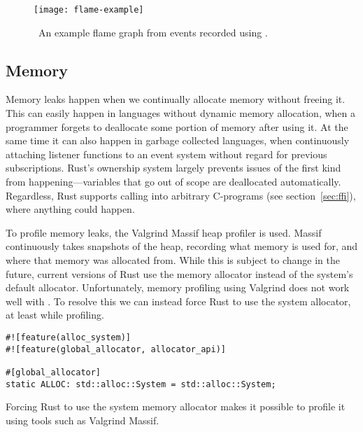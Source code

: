 \begin{figure}[H]
  \centering
  \texttt{[image: flame-example]}
  \caption{\
    An example flame graph from events recorded using .
  }\label{fig:flame-example}
\end{figure}

\subsection{Memory}

Memory leaks happen when we continually allocate memory without freeing it. This
can easily happen in languages without dynamic memory allocation, when a
programmer forgets to deallocate some portion of memory after using it. At the
same time it can also happen in garbage collected languages, \eg when
continuously attaching listener functions to an event system without regard for
previous subscriptions. Rust's ownership system largely prevents issues of the
first kind from happening---variables that go out of scope are deallocated
automatically. Regardless, Rust supports calling into arbitrary C-programs (see
section~\ref{sec:ffi}), where anything could happen.

To profile memory leaks, the Valgrind
Massif heap profiler is
used. Massif continuously takes snapshots of the heap, recording what memory is
used for, and where that memory was allocated from. While this is subject to
change in the future, current versions of Rust use the
 memory allocator instead of the
system's default allocator. Unfortunately, memory profiling using Valgrind does
not work well with \code{jemalloc}. To resolve this we can instead force Rust to
use the system allocator, at least while profiling.

\begin{listing}[H]
  \begin{verbatim}
#![feature(alloc_system)]
#![feature(global_allocator, allocator_api)]

#[global_allocator]
static ALLOC: std::alloc::System = std::alloc::System;
  \end{verbatim}

  \caption{Forcing Rust to use the system memory allocator makes it possible to
  profile it using tools such as Valgrind Massif.}\label{lst:system-alloc}
\end{listing}


